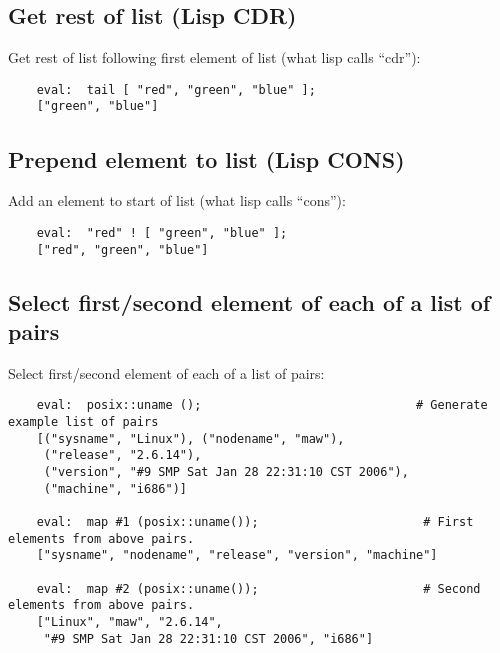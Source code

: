 \cutend*

\subsection{Get rest of list (Lisp {\sc CDR})}

Get rest of list following first element of list (what lisp calls ``cdr''):
\begin{verbatim}
    eval:  tail [ "red", "green", "blue" ];
    ["green", "blue"]
\end{verbatim}

\cutend*

\subsection{Prepend element to list (Lisp {\sc CONS})}

Add an element to start of list (what lisp calls ``cons''):
\begin{verbatim}
    eval:  "red" ! [ "green", "blue" ];
    ["red", "green", "blue"]
\end{verbatim}

\cutend*

\subsection{Select first/second element of each of a list of pairs}

Select first/second element of each of a list of pairs:
\begin{verbatim}
    eval:  posix::uname ();                              # Generate example list of pairs
    [("sysname", "Linux"), ("nodename", "maw"), 
     ("release", "2.6.14"), 
     ("version", "#9 SMP Sat Jan 28 22:31:10 CST 2006"), 
     ("machine", "i686")]

    eval:  map #1 (posix::uname());                       # First elements from above pairs.
    ["sysname", "nodename", "release", "version", "machine"]

    eval:  map #2 (posix::uname());                       # Second elements from above pairs.
    ["Linux", "maw", "2.6.14", 
     "#9 SMP Sat Jan 28 22:31:10 CST 2006", "i686"]
\end{verbatim}

